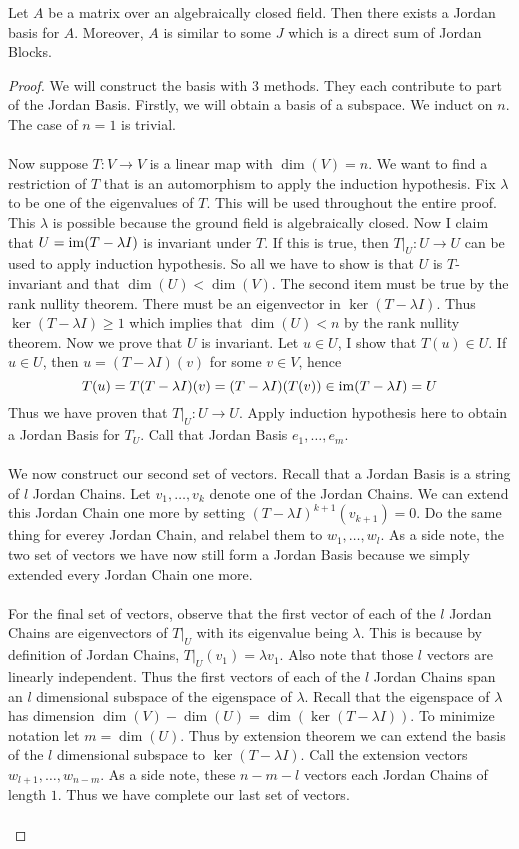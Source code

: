\documentclass[a4paper]{article}
\begin{document}
\begin{thm}{}{} Let $A$ be a matrix over an algebraically closed field. Then there exists a Jordan basis for $A$. Moreover, $A$ is similar to some $J$ which is a direct sum of Jordan Blocks. \tcbline
\begin{proof} We will construct the basis with $3$ methods. They each contribute to part of the Jordan Basis. Firstly, we will obtain a basis of a subspace. We induct on $n$. The case of $n=1$ is trivial. \\~\\
Now suppose $T:V\to V$ is a linear map with $\dim(V)=n$. We want to find a restriction of $T$ that is an automorphism to apply the induction hypothesis. Fix $\lambda$ to be one of the eigenvalues of $T$. This will be used throughout the entire proof. This $\lambda$ is possible because the ground field is algebraically closed. Now I claim that $U=\operatorname{im}(T-\lambda I)$ is invariant under $T$. If this is true, then $T|_U:U\to U$ can be used to apply induction hypothesis. So all we have to show is that $U$ is $T$-invariant and that $\dim(U)<\dim(V)$. The second item must be true by the rank nullity theorem. There must be an eigenvector in $\ker(T-\lambda I)$. Thus $\ker(T-\lambda I)\geq 1$ which implies that $\dim(U)<n$ by the rank nullity theorem. Now we prove that $U$ is invariant. Let $u\in U$, I show that $T(u)\in U$. If $u\in U$, then $u=(T-\lambda I)(v)$ for some $v\in V$, hence $$T(u)=T(T-\lambda I)(v)=(T-\lambda I)(T(v))\in\operatorname{im}(T-\lambda I)=U$$ Thus we have proven that $T|_U:U\to U$. Apply induction hypothesis here to obtain a Jordan Basis for $T_U$. Call that Jordan Basis $e_1,\dots,e_m$. \\~\\
We now construct our second set of vectors. Recall that a Jordan Basis is a string of $l$ Jordan Chains. Let $v_1,\dots,v_k$ denote one of the Jordan Chains. We can extend this Jordan Chain one more by setting $(T-\lambda I)^{k+1}(v_{k+1})=0$. Do the same thing for everey Jordan Chain, and relabel them to $w_1,\dots,w_l$. As a side note, the two set of vectors we have now still form a Jordan Basis because we simply extended every Jordan Chain one more. \\~\\
For the final set of vectors, observe that the first vector of each of the $l$ Jordan Chains are eigenvectors of $T|_U$ with its eigenvalue being $\lambda$. This is because by definition of Jordan Chains, $T|_U(v_1)=\lambda v_1$. Also note that those $l$ vectors are linearly independent. Thus the first vectors of each of the $l$ Jordan Chains span an $l$ dimensional subspace of the eigenspace of $\lambda$. Recall that the eigenspace of $\lambda$ has dimension $\dim(V)-\dim(U)=\dim(\ker(T-\lambda I))$. To minimize notation let $m=\dim(U)$. Thus by extension theorem we can extend the basis of the $l$ dimensional subspace to $\ker(T-\lambda I)$. Call the extension vectors $w_{l+1},\dots,w_{n-m}$. As a side note, these $n-m-l$ vectors each Jordan Chains of length $1$. Thus we have complete our last set of vectors. \\~\\

\end{proof}
\end{thm}
\end{document}
